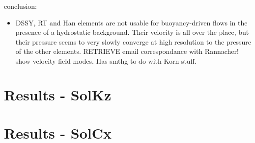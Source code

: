 
conclusion:

\begin{itemize}
\item DSSY, RT and Han elements are not usable for buoyancy-driven flows in the presence of a hydrostatic 
background. Their velocity is all over the place, but their pressure seems to very slowly 
converge at high resolution to the pressure of the other elements.
RETRIEVE email correspondance with Rannacher! show velocity field modes. Has smthg to do with 
Korn stuff.
\end{itemize}

\newpage
\section*{Results - SolKz}


\section*{Results - SolCx}



